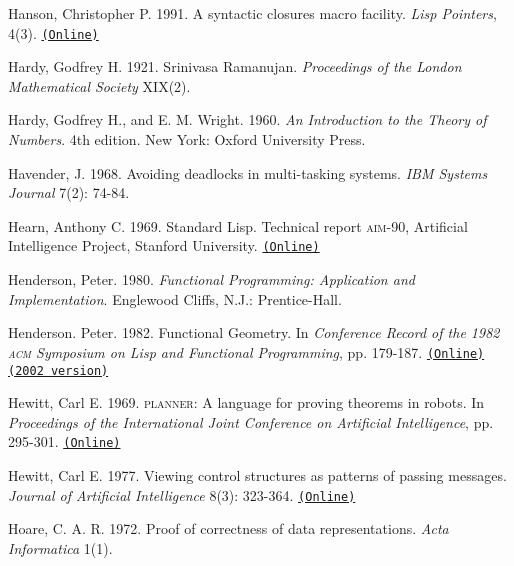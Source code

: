\documentclass[oneside]{book}
\newcommand{\acronym}[1]{\textsc{\MakeLowercase{#1}}}
\newcommand{\code}[1]{\texttt{#1}}
\begin{document}
 \label{Hanson 1991}
Hanson, Christopher P.  1991.  A syntactic closures macro facility.  \textit{Lisp
Pointers}, 4(3).
\href{http://groups.csail.mit.edu/mac/ftpdir/scheme-reports/synclo.ps}{\code{(Online)}}

 \label{Hardy 1921}
Hardy, Godfrey H.  1921.  Srinivasa Ramanujan.  \textit{Proceedings of the London
Mathematical Society} XIX(2).

 \label{Hardy and Wright 1960}
Hardy, Godfrey H., and E. M. Wright.  1960.  \textit{An Introduction to the
Theory of Numbers}.  4th edition.  New York: Oxford University Press.

 \label{Havender (1968)}
Havender, J. 1968. Avoiding deadlocks in multi-tasking systems. \textit{IBM
Systems Journal} 7(2): 74-84.

 \label{Hearn 1969}
Hearn, Anthony C.  1969.  Standard Lisp.  Technical report \acronym{AIM}-90,
Artificial Intelligence Project, Stanford University.
\href{http://www.softwarepreservation.org/projects/LISP/stanford/Hearn-StandardLisp-AIM-90.pdf}{\code{(Online)}}

 \label{Henderson 1980}
Henderson, Peter. 1980.  \textit{Functional Programming: Application and
Implementation}. Englewood Cliffs, N.J.: Prentice-Hall.

 \label{Henderson 1982}
Henderson. Peter. 1982. Functional Geometry. In \textit{Conference Record of the
1982 \acronym{ACM} Symposium on Lisp and Functional Programming}, pp. 179-187.
\href{http://pmh-systems.co.uk/phAcademic/papers/funcgeo.pdf}{\code{(Online)}}
\href{http://eprints.soton.ac.uk/257577/1/funcgeo2.pdf}{\code{(2002 version)}}

 \label{Hewitt (1969)}
Hewitt, Carl E.  1969.  \acronym{PLANNER}: A language for proving
theorems in robots.  In \textit{Proceedings of the International Joint
Conference on Artificial Intelligence}, pp. 295-301.
\href{http://dspace.mit.edu/handle/1721.1/6171}{\code{(Online)}}

 \label{Hewitt (1977)}
Hewitt, Carl E.  1977.  Viewing control structures as patterns of passing
messages.  \textit{Journal of Artificial Intelligence} 8(3): 323-364.
\href{http://dspace.mit.edu/handle/1721.1/6272}{\code{(Online)}}

 \label{Hoare (1972)}
Hoare, C. A. R. 1972.  Proof of correctness of data representations.
\textit{Acta Informatica} 1(1).
\end{document}
